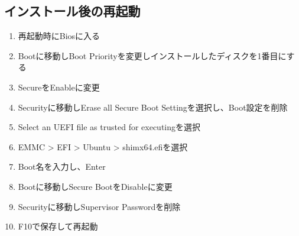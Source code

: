 \documentclass[a4paper, 11pt, dvipdfmx]{jsarticle}
\begin{document}
\subsection{インストール後の再起動}
  \begin{enumerate}
    \item 再起動時にBiosに入る
    \item Bootに移動しBoot Priorityを変更しインストールしたディスクを1番目にする
    \item SecureをEnableに変更
    \item Securityに移動しErase all Secure Boot Settingを選択し、Boot設定を削除
    \item Select an UEFI file as trusted for executingを選択
    \item EMMC > EFI > Ubuntu > shimx64.efiを選択
    \item Boot名を入力し、Enter
    \item Bootに移動しSecure BootをDisableに変更
    \item Securityに移動しSupervisor Passwordを削除
    \item F10で保存して再起動
  \end{enumerate}
\end{document}
